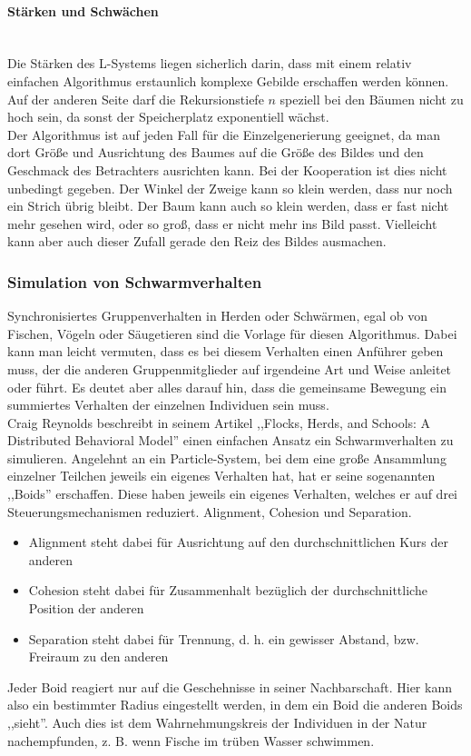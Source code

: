 \documentclass[../mciAusarbeitung.tex]{subfiles}
\begin{document}
				
		
		\paragraph{Stärken und Schwächen}$~$\\
		Die Stärken des L-Systems liegen sicherlich darin, dass mit einem relativ einfachen Algorithmus erstaunlich komplexe Gebilde erschaffen werden können. Auf der anderen Seite darf die Rekursionstiefe $ n $ speziell bei den Bäumen nicht zu hoch sein, da sonst der Speicherplatz exponentiell wächst.\\
		Der Algorithmus ist auf jeden Fall für die Einzelgenerierung geeignet, da man dort Größe und Ausrichtung des Baumes auf die Größe des Bildes und den Geschmack des Betrachters ausrichten kann. Bei der Kooperation ist dies nicht unbedingt gegeben. Der Winkel der Zweige kann so klein werden, dass nur noch ein Strich übrig bleibt. Der Baum kann auch so klein werden, dass er fast nicht mehr gesehen wird, oder so groß, dass er nicht mehr ins Bild passt. Vielleicht kann aber auch dieser Zufall gerade den Reiz des Bildes ausmachen.
	 
	 
	\subsubsection{Simulation von Schwarmverhalten}
		Synchronisiertes Gruppenverhalten in Herden oder Schwärmen, egal ob von Fischen, Vögeln oder Säugetieren sind die Vorlage für diesen Algorithmus. Dabei kann man leicht vermuten, dass es bei diesem Verhalten einen Anführer geben muss, der die anderen Gruppenmitglieder auf irgendeine Art und Weise anleitet oder führt. Es deutet aber alles darauf hin, dass die gemeinsame Bewegung ein summiertes Verhalten der einzelnen Individuen sein muss.\\
		Craig Reynolds beschreibt in seinem Artikel ,,Flocks, Herds, and Schools: A Distributed Behavioral Model'' \cite{reynolds1987flocks} einen einfachen Ansatz ein Schwarmverhalten zu simulieren. Angelehnt an ein Particle-System, bei dem eine große Ansammlung einzelner Teilchen jeweils ein eigenes Verhalten hat, hat er seine sogenannten ,,Boids'' erschaffen. Diese haben jeweils ein eigenes Verhalten, welches er auf drei Steuerungsmechanismen reduziert. Alignment, Cohesion und Separation.
		\begin{itemize}
			\item Alignment steht dabei für Ausrichtung auf den durchschnittlichen Kurs der anderen
			\item Cohesion steht dabei für Zusammenhalt bezüglich der durchschnittliche Position der anderen
			\item Separation steht dabei für Trennung, d. h. ein gewisser Abstand, bzw. Freiraum zu den anderen
		\end{itemize}
		Jeder Boid reagiert nur auf die Geschehnisse in seiner Nachbarschaft. Hier kann also ein bestimmter Radius eingestellt werden, in dem ein Boid die anderen Boids ,,sieht''. Auch dies ist dem Wahrnehmungskreis der Individuen in der Natur nachempfunden, z. B. wenn Fische im trüben Wasser schwimmen.
\end{document}
